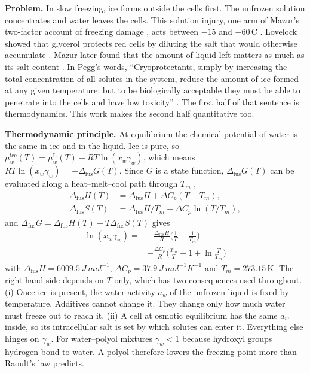\documentclass[10pt,a4paper,twocolumn]{article}
\newcommand{\dfus}{\Delta_{\mathrm{fus}}}
\begin{document}
\textbf{Problem.} In slow freezing, ice forms outside the cells first. The unfrozen solution concentrates and water leaves the cells. This solution
injury, one arm of Mazur's two-factor account of freezing damage \cite{mazur}, acts between $-15$ and
$-60$\,\textdegree C \cite{gao}. Lovelock showed
that glycerol protects red cells by diluting the salt that would otherwise accumulate \cite{lovelock10,lovelock11}.
Mazur later found that the amount of liquid left matters as much as its salt content \cite{mazur81,mazur89}.
In Pegg's words, ``Cryoprotectants, simply by increasing the total concentration of all solutes in the system,
reduce the amount of ice formed at any given temperature; but to be biologically acceptable they must be able
to penetrate into the cells and have low toxicity'' \cite{pegg}. The first half of that sentence is
thermodynamics. This work makes the second half quantitative too.

\textbf{Thermodynamic principle.} At equilibrium the chemical potential of water is the same in ice and in
the liquid. Ice is pure, so $\mu_w^{\mathrm{ice}}(T)=\mu_w^{\mathrm{L}}(T)+RT\ln(x_w\gamma_w)$, which means
$RT\ln(x_w\gamma_w)=-\dfus G(T)$. Since $G$ is a state function, $\dfus G(T)$ can be evaluated along a
heat--melt--cool path through $T_m$ \cite{sandler},
\begin{equation*}
\begin{split}
\dfus H(T)&=\dfus H+\Delta C_p(T-T_m),\\
\dfus S(T)&=\dfus H/T_m+\Delta C_p\ln(T/T_m),
\end{split}
\end{equation*}
and $\dfus G=\dfus H(T)-T\dfus S(T)$ gives
\begin{equation}
\begin{split}
\ln(x_w\gamma_w) = &-\frac{\dfus H}{R}\Big(\frac1T-\frac1{T_m}\Big)\\
&-\frac{\Delta C_p}{R}\Big(\frac{T_m}{T}-1+\ln\frac{T}{T_m}\Big)
\end{split}
\label{eq:sle}
\end{equation}
with $\dfus H=\SI{6009.5}{J\,mol^{-1}}$, $\Delta C_p=\SI{37.9}{J\,mol^{-1}K^{-1}}$ and $T_m=273.15$\,K. The
right-hand side depends on $T$ only, which has two consequences used throughout. (i) Once ice is present, the
water activity $a_w$ of the unfrozen liquid is fixed by temperature. Additives cannot change it. They change
only how much water must freeze out to reach it. (ii) A cell at osmotic equilibrium has the same $a_w$ inside,
so its intracellular salt is set by which solutes can enter it. Everything else hinges on $\gamma_w$. For
water--polyol mixtures $\gamma_w<1$ because hydroxyl groups hydrogen-bond to water. A polyol therefore lowers
the freezing point more than Raoult's law predicts.
\end{document}

